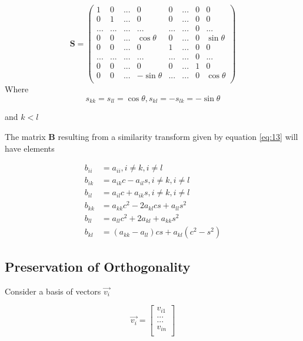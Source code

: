 \documentclass[a4paper,11pt]{article}
\begin{document}
\begin{equation}\label{eq:19}
\mathbf S = 
\begin{pmatrix}
1 & 0 & ... & 0 & 0 & ... & 0 & 0 \\
0 & 1 & ... & 0 & 0 & ... & 0 & 0 \\
... & ... & ... & ... & ... & ... & 0 & ... \\
0 & 0 & ... & \cos{\theta} & 0 & ... & 0 & \sin{\theta} \\ 
0 & 0 & ... & 0 & 1 & ... & 0 & 0 \\
... & ... & ... & ... & ... & ... & 0 & ... \\
0 & 0 & ... & 0 & 0 & ... & 1 & 0 \\ 
0 & 0 & ... & -\sin{\theta} & ... & ... & 0 & \cos{\theta} \\
\end{pmatrix}
\end{equation}
Where 
\begin{equation}\label{eq:20}
s_{kk} = s_{ll} = \cos{\theta}, s_{kl} = -s_{lk} = -\sin{\theta}
\end{equation}

and $k<l$

The matrix $\mathbf{B}$ resulting from a similarity transform given by equation \ref{eq:13} will have elements

\begin{align*}
    b_{ii} &= a_{ii}, i\neq k, i \neq l \\ 
    b_{ik} & = a_{ik}c - a_{il}s, i\neq k , i\neq l \\
    b_{il} &= a_{il}c + a_{ik} s, i\neq k, i\neq l \\
    b_{kk} &= a_{kk}c^2 - 2a_{kl}cs + a_{ll}s^2 \\ 
    b_{ll} &= a_{ll}c^2 + 2a_{kl} + a_{kk}s^2 \\ 
    b_{kl} &= (a_{kk} - a_{ll})cs + a_{kl}(c^2 - s^2)
\end{align*}

\subsection{Preservation of Orthogonality}
Consider a basis of vectors $\vec{v_i}$

\begin{equation}\label{eq:21}
    \vec{v_i} =
    \begin{bmatrix}
    v_{i1} \\
    ... \\
    ... \\
    v_{in}\\
    \end{bmatrix}
\end{equation}
\end{document}

